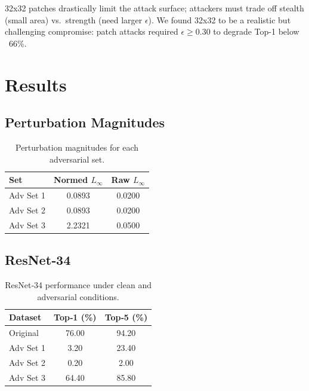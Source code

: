 \documentclass[twoside,11pt]{article}
\begin{document}
32x32 patches drastically limit the attack surface; attackers must trade off stealth (small area) vs.\ strength (need larger $\epsilon$). We found 32x32 to be a realistic but challenging compromise: patch attacks required $\epsilon\ge0.30$ to degrade Top-1 below ~66\%.

\section{Results}

\subsection{Perturbation Magnitudes}
\begin{table}[H]
  \centering
  \begin{tabular}{lcc}
    \toprule
    Set & Normed \(L_\infty\) & Raw \(L_\infty\) \\
    \midrule
    Adv Set 1 & 0.0893 & 0.0200 \\
    Adv Set 2 & 0.0893 & 0.0200 \\
    Adv Set 3 & 2.2321 & 0.0500 \\
    \bottomrule
  \end{tabular}
  \caption{Perturbation magnitudes for each adversarial set.}
  \label{tab:perturbation-magnitudes}
\end{table}

\subsection{ResNet‑34}
\begin{table}[H]
  \centering
  \begin{tabular}{lcc}
    \toprule
    Dataset & Top‑1 (\%) & Top‑5 (\%) \\
    \midrule
    Original  & 76.00 & 94.20 \\
    Adv Set 1 &  3.20 & 23.40 \\
    Adv Set 2 &  0.20 &  2.00 \\
    Adv Set 3 & 64.40 & 85.80 \\
    \bottomrule
  \end{tabular}
  \caption{ResNet‑34 performance under clean and adversarial conditions.}
  \label{tab:resnet34-results}
\end{table}
\end{document}

